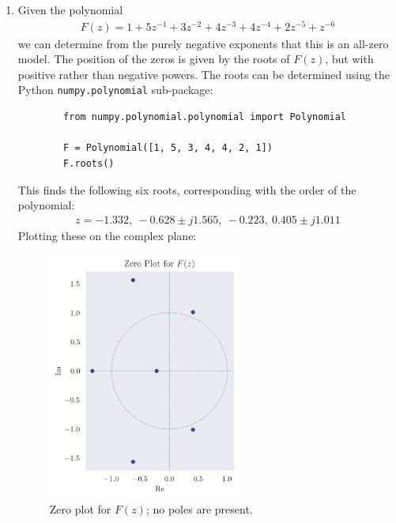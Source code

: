 \documentclass[a4paper, 11pt]{article}
\begin{document}
\begin{enumerate}[label=\alph*)]

    \item Given the polynomial
    \begin{align*}
        F(z) = 1 + 5z^{-1} + 3z^{-2} + 4z^{-3} + 4z^{-4} + 2z^{-5} + z^{-6}
    \end{align*}
    we can determine from the purely negative exponents that this is an all-zero
    model. The position of the zeros is given by the roots of $F(z)$, but with
    positive rather than negative powers. The roots can be determined using the
    Python \texttt{numpy.polynomial} sub-package:
    \begin{verbatim}
        from numpy.polynomial.polynomial import Polynomial

        F = Polynomial([1, 5, 3, 4, 4, 2, 1])
        F.roots()
    \end{verbatim}
    This finds the following six roots, corresponding with the order of the
    polynomial:
    \begin{align*}
        z = -1.332,\ -0.628\pm j1.565,\ -0.223,\ 0.405\pm j1.011
    \end{align*}
    Plotting these on the complex plane:
    \begin{figure}[ht]
        \centering
        \includegraphics[width=0.6\textwidth]{images/q5_polezero.png}
        \caption{Zero plot for $F(z)$; no poles are present.}
        \label{fig:q5_polezero}
    \end{figure}

\end{enumerate}
\end{document}
